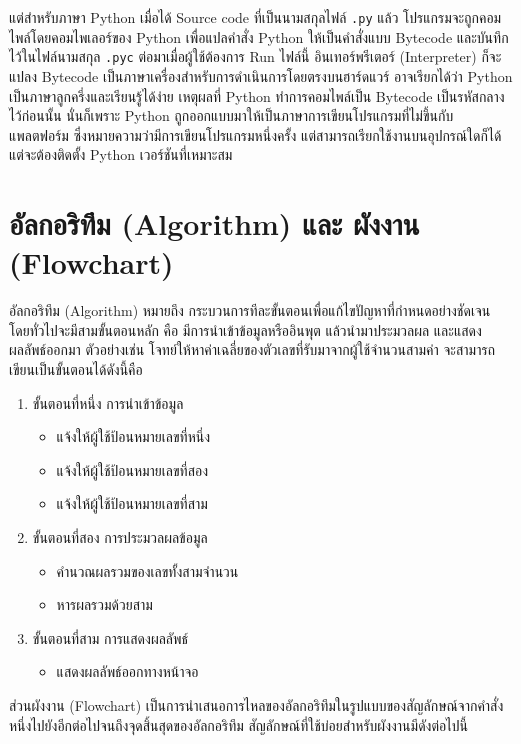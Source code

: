 แต่สำหรับภาษา Python เมื่อได้ Source code ที่เป็นนามสกุลไฟล์ \texttt{.py} แล้ว โปรแกรมจะถูกคอมไพล์โดยคอมไพเลอร์ของ Python เพื่อแปลคำสั่ง Python ให้เป็นคำสั่งแบบ Bytecode และบันทึกไว้ในไฟล์นามสกุล \texttt{.pyc} ต่อมาเมื่อผู้ใช้ต้องการ Run ไฟล์นี้ อินเทอร์พรีเตอร์ (Interpreter) ก็จะแปลง Bytecode เป็นภาษาเครื่องสำหรับการดำเนินการโดยตรงบนฮาร์ดแวร์ \cite{Bea13} อาจเรียกได้ว่า Python เป็นภาษาลูกครึ่งและเรียนรู้ได้ง่าย เหตุผลที่ Python ทำการคอมไพล์เป็น Bytecode เป็นรหัสกลางไว้ก่อนนั้น นั่นก็เพราะ Python ถูกออกแบบมาให้เป็นภาษาการเขียนโปรแกรมที่ไม่ขึ้นกับแพลตฟอร์ม ซึ่งหมายความว่ามีการเขียนโปรแกรมหนึ่งครั้ง แต่สามารถเรียกใช้งานบนอุปกรณ์ใดก็ได้ แต่จะต้องติดตั้ง Python เวอร์ชันที่เหมาะสม 

\section{อัลกอริทึม (Algorithm) และ ผังงาน (Flowchart)}

อัลกอริทึม (Algorithm) หมายถึง กระบวนการทีละขั้นตอนเพื่อแก้ไขปัญหาที่กำหนดอย่างชัดเจน โดยทั่วไปจะมีสามขั้นตอนหลัก คือ มีการนำเข้าข้อมูลหรืออินพุต แล้วนำมาประมวลผล และแสดงผลลัพธ์ออกมา \cite{Ari19} ตัวอย่างเช่น โจทย์ให้หาค่าเฉลี่ยของตัวเลขที่รับมาจากผู้ใช้จำนวนสามค่า จะสามารถเขียนเป็นขั้นตอนได้ดังนี้คือ


\begin{enumerate}[noitemsep]
    \item ขั้นตอนที่หนึ่ง การนำเข้าข้อมูล
    \begin{itemize}
        \item แจ้งให้ผู้ใช้ป้อนหมายเลขที่หนึ่ง
        \item แจ้งให้ผู้ใช้ป้อนหมายเลขที่สอง
        \item แจ้งให้ผู้ใช้ป้อนหมายเลขที่สาม
    \end{itemize}
    \item ขั้นตอนที่สอง การประมวลผลข้อมูล
    \begin{itemize}
       \item คำนวณผลรวมของเลขทั้งสามจำนวน
       \item หารผลรวมด้วยสาม
    \end{itemize}
    \item ขั้นตอนที่สาม การแสดงผลลัพธ์
    \begin{itemize}
        \item แสดงผลลัพธ์ออกทางหน้าจอ
    \end{itemize}
\end{enumerate}

ส่วนผังงาน (Flowchart) เป็นการนำเสนอการไหลของอัลกอริทึมในรูปแบบของสัญลักษณ์จากคำสั่งหนึ่งไปยังอีกต่อไปจนถึงจุดสิ้นสุดของอัลกอริทึม \cite{Cor09} สัญลักษณ์ที่ใช้บ่อยสำหรับผังงานมีดังต่อไปนี้


